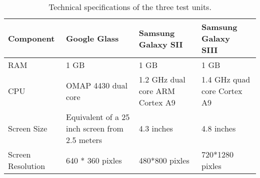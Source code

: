 	\begin{table}[H]%
    		\caption{Technical specifications of the three test units.} \label{tab:textUnitsSpecs}
		\centering \begin{tabularx}{\textwidth}{l|X|X|X} \hline
		\textbf{Component} & \textbf{Google Glass~\cite{googleGlassWiki}} & \textbf{Samsung Galaxy SII~\cite{samsungGalaxyS2Wiki}} & \textbf{Samsung Galaxy SIII~\cite{samsungGalaxyS3Wiki}} \\ \hline \hline
       
		RAM				&	1 GB	~\cite{googleGlassEdition1RAM}			&	1 GB				&	1 GB		\\ \hline
		CPU				&	OMAP 4430 dual core~\cite{googleGlassCPU}				&	1.2 GHz dual core ARM Cortex A9				&	1.4 GHz quad core Cortex A9		\\ \hline
		Screen Size		&	Equivalent of a 25 inch screen from 2.5 meters~\cite{GlassSpecs}				&	4.3 inches				&	4.8 inches		\\ \hline
		Screen Resolution	&	640 * 360 pixles	&	480*800 pixles				&	720*1280 pixles		\\ \hline
		
		\end{tabularx}
	\end{table}

